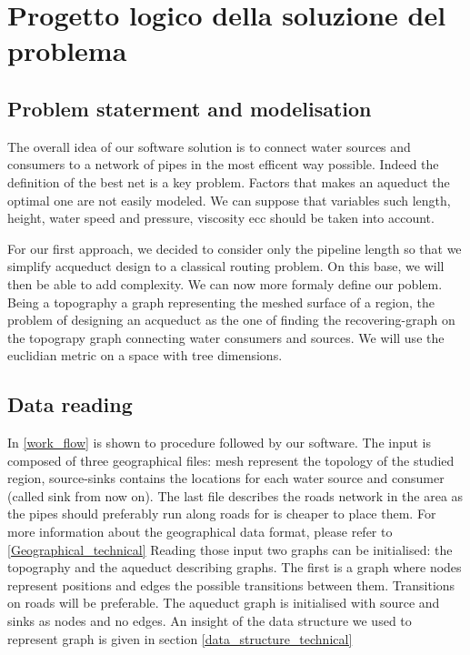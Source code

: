 \chapter{Progetto logico della soluzione del problema}
\label{capitolo4}
\thispagestyle{empty}


\section{Problem staterment and modelisation}
The overall idea of our software solution is to connect water sources and consumers to a network of 
pipes in the most efficent way possible. Indeed the definition of the best net is a key problem. 
Factors that makes an aqueduct the optimal one are not easily modeled. We can suppose that variables 
such length, height, water speed and pressure, viscosity ecc should be taken into account.

\bigbreak
For our first approach, we decided to consider only the pipeline length so that we simplify 
acqueduct design to a classical routing problem. On this base, we will then be able to add complexity.
We can now more formaly define our poblem. Being a topography a graph representing the meshed 
surface of a region, the problem of designing an acqueduct as the one of finding the recovering-graph 
on the topograpy graph connecting water consumers and sources. We will use the euclidian metric on a 
space with tree dimensions.



\section{Data reading}
In \ref{work_flow} is shown to procedure followed by our software. 
The input is composed of three geographical files: mesh represent the topology of the studied region, source-sinks contains the locations for each water source and consumer (called sink from now on). The last file describes the roads network in the area as the pipes should preferably run along roads for is cheaper to place them. For more information about the geographical data format, please refer to \ref{Geographical_technical}
Reading those input two graphs can be initialised: the topography and the aqueduct describing graphs. The first is a graph where nodes represent positions and edges the possible transitions between them. Transitions on roads will be preferable. The aqueduct graph is initialised with source and sinks as nodes and no edges. An insight of the data structure we used to represent graph is given in section \ref {data_structure_technical}

